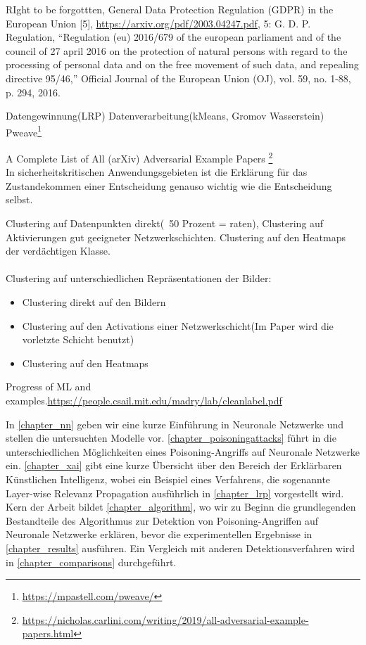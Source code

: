 \documentclass[11pt,a4paper]{article}
\numberwithin{equation}{section}
\begin{document}
	
	
	
	RIght to be forgottten,  General Data Protection Regulation (GDPR) in
	the European Union [5], \url{https://arxiv.org/pdf/2003.04247.pdf}, 5: G. D. P. Regulation, “Regulation (eu) 2016/679 of the
	european parliament and of the council of 27 april 2016
	on the protection of natural persons with regard to the
	processing of personal data and on the free movement
	of such data, and repealing directive 95/46,” Official
	Journal of the European Union (OJ), vol. 59, no. 1-88,
	p. 294, 2016.
	
	Datengewinnung(LRP)
	Datenverarbeitung(kMeans, Gromov Wasserstein)
	Pweave\footnote{\url{https://mpastell.com/pweave/}}
	
	A Complete List of All (arXiv) Adversarial Example Papers \footnote{\url{https://nicholas.carlini.com/writing/2019/all-adversarial-example-papers.html}}
	\\
	In sicherheitskritischen Anwendungsgebieten ist die Erklärung für das Zustandekommen einer Entscheidung genauso wichtig wie die Entscheidung selbst\cite{LRP_DNN}.
	
	Clustering auf Datenpunkten direkt(~50 Prozent = raten), Clustering auf Aktivierungen gut geeigneter Netzwerkschichten. Clustering auf den Heatmaps der verdächtigen Klasse.\\
	\\
	
	Clustering auf unterschiedlichen Repräsentationen der Bilder:
	\begin{itemize}
		\item Clustering direkt auf den Bildern\\
		\item Clustering auf den Activations einer Netzwerkschicht(Im Paper \cite{AC} wird die vorletzte Schicht benutzt)
		\item Clustering auf den Heatmaps
	\end{itemize}

	Progress of ML and examples.\url{https://people.csail.mit.edu/madry/lab/cleanlabel.pdf}



	In \autoref{chapter_nn} geben wir eine kurze Einführung in Neuronale Netzwerke und stellen die untersuchten Modelle vor. \autoref{chapter_poisoningattacks} führt in die unterschiedlichen Möglichkeiten eines Poisoning-Angriffs auf Neuronale Netzwerke ein. \autoref{chapter_xai} gibt eine kurze Übersicht über den Bereich der Erklärbaren Künstlichen Intelligenz, wobei ein Beispiel eines Verfahrens, die sogenannte Layer-wise Relevanz Propagation ausführlich in \autoref{chapter_lrp} vorgestellt wird. Kern der Arbeit bildet \autoref{chapter_algorithm}, wo wir zu Beginn die grundlegenden Bestandteile des Algorithmus zur Detektion von Poisoning-Angriffen auf Neuronale Netzwerke erklären, bevor die experimentellen Ergebnisse in \autoref{chapter_results} ausführen. Ein Vergleich mit anderen Detektionsverfahren wird in \autoref{chapter_comparisons} durchgeführt.
\end{document}
